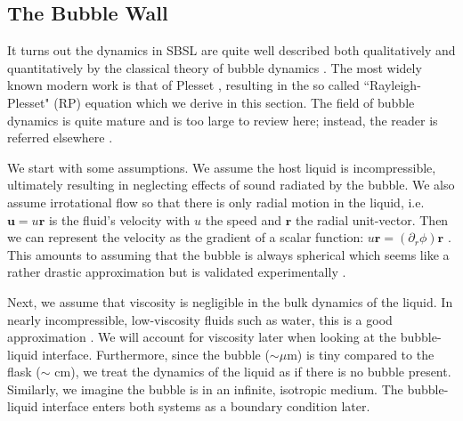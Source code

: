 \documentclass[11pt,prb,aps,nofootinbib,superscriptaddress,floatfix]{revtex4-2}
\begin{document}
\subsection{The Bubble Wall}
It turns out the dynamics in SBSL are quite well described both qualitatively and quantitatively by the classical theory of bubble dynamics \cite{prosperetti1999old,brenner2002single,prosperetti1986bubble,plesset1977bubble,suslick2008inside,yasui2018acoustic,brennen2014cavitation}. The most widely known modern work is that of Plesset \cite{plesset1977bubble,plesset1949dynamics,prosperetti1986bubble}, resulting in the so called ``Rayleigh-Plesset" (RP) equation which we derive in this section. The field of bubble dynamics is quite mature and is too large to review here; instead, the reader is referred elsewhere \cite{prosperetti1999old,brenner2002single,prosperetti1986bubble,brennen2014cavitation}. 

We start with some assumptions. We assume the host liquid is incompressible, ultimately resulting in neglecting effects of sound radiated by the bubble. We also assume irrotational flow so that there is only radial motion in the liquid, i.e. $\bm{u}=u\bm{r}$ is the fluid's velocity with $u$ the speed and $\bm{r}$ the radial unit-vector. Then we can represent the velocity as the gradient of a scalar function: $u\bm{r}=(\partial_r \phi) \bm{r}$ \cite{jackson1999classical}. This amounts to assuming that the bubble is always spherical which seems like a rather drastic approximation but is validated experimentally \cite{prosperetti1999old,brenner2002single}.  %

Next, we assume that viscosity is negligible in the bulk dynamics of the liquid. In nearly incompressible, low-viscosity fluids such as water, this is a good approximation \cite{prosperetti1986bubble,prosperetti1999old,brenner2002single,plesset1977bubble}. We will account for viscosity later when looking at the bubble-liquid interface. Furthermore, since the bubble ($\sim\mu$m) is tiny compared to the flask ($\sim$ cm), we treat the dynamics of the liquid as if there is no bubble present. Similarly, we imagine the bubble is in an infinite, isotropic medium. The bubble-liquid interface enters both systems as a boundary condition later.
\end{document}
